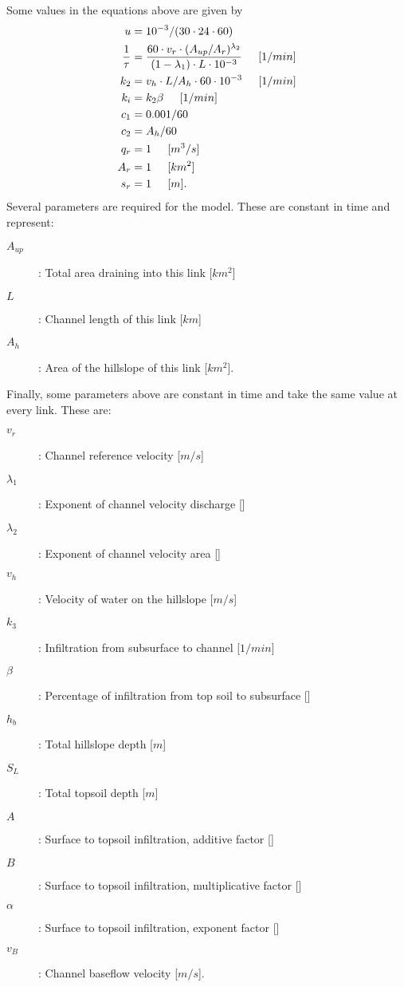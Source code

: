 \documentclass[12pt]{article}
\begin{document}
Some values in the equations above are given by
\begin{align*}
 u &= 10^{-3}/(30\cdot24\cdot60) \\
 \frac{1}{\tau} &= \frac{60 \cdot v_r \cdot (A_{up}/A_r)^{\lambda_2}}{(1-\lambda_1) \cdot L \cdot 10^{-3}} \hspace{.2in} [1/min] \\
 k_2 &= v_h \cdot L / A_h \cdot 60 \cdot 10^{-3} \hspace{.2in} [1/min] \\
 k_i &= k_2 \beta \hspace{.2in} [1/min] \\
 c_1 &= 0.001 / 60 \\
 c_2 &= A_h / 60 \\
 q_r &= 1 \hspace{.2in} [m^3/s] \\
 A_r &= 1 \hspace{.2in} [km^2] \\
 s_r &= 1 \hspace{.2in} [m].
\end{align*}
Several parameters are required for the model. These are constant in time and represent:
\begin{description}
 \item[$A_{up}$]: Total area draining into this link [$km^2$]
 \item[$L$]: Channel length of this link [$km$]
 \item[$A_h$]: Area of the hillslope of this link [$km^2$].
\end{description}
Finally, some parameters above are constant in time and take the same value at every link. These are:
\begin{description}
 \item[$v_r$]: Channel reference velocity [$m/s$]
 \item[$\lambda_1$]: Exponent of channel velocity discharge []
 \item[$\lambda_2$]: Exponent of channel velocity area []
 \item[$v_h$]: Velocity of water on the hillslope [$m/s$]
 \item[$k_3$]: Infiltration from subsurface to channel [$1/min$]
 \item[$\beta$]: Percentage of infiltration from top soil to subsurface []
 \item[$h_b$]: Total hillslope depth [$m$]
 \item[$S_L$]: Total topsoil depth [$m$]
 \item[$A$]: Surface to topsoil infiltration, additive factor []
 \item[$B$]: Surface to topsoil infiltration, multiplicative factor []
 \item[$\alpha$]: Surface to topsoil infiltration, exponent factor []
 \item[$v_B$]: Channel baseflow velocity [$m/s$].
\end{description}
\end{document}
